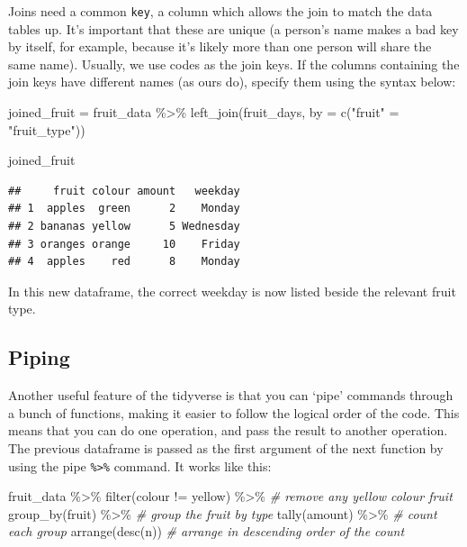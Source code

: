 \documentclass[
]{book}
\newenvironment{Shaded}{\begin{snugshade}}{\end{snugshade}}
\newcommand{\AttributeTok}[1]{\textcolor[rgb]{0.77,0.63,0.00}{#1}}
\newcommand{\CommentTok}[1]{\textcolor[rgb]{0.56,0.35,0.01}{\textit{#1}}}
\newcommand{\FunctionTok}[1]{\textcolor[rgb]{0.00,0.00,0.00}{#1}}
\newcommand{\NormalTok}[1]{#1}
\newcommand{\OtherTok}[1]{\textcolor[rgb]{0.56,0.35,0.01}{#1}}
\newcommand{\SpecialCharTok}[1]{\textcolor[rgb]{0.00,0.00,0.00}{#1}}
\newcommand{\StringTok}[1]{\textcolor[rgb]{0.31,0.60,0.02}{#1}}
\begin{document}
Joins need a common \texttt{key}, a column which allows the join to match the data tables up. It's important that these are unique (a person's name makes a bad key by itself, for example, because it's likely more than one person will share the same name). Usually, we use codes as the join keys. If the columns containing the join keys have different names (as ours do), specify them using the syntax below:

\begin{Shaded}
\begin{Highlighting}[]
\NormalTok{joined\_fruit }\OtherTok{=}\NormalTok{ fruit\_data }\SpecialCharTok{\%\textgreater{}\%} \FunctionTok{left\_join}\NormalTok{(fruit\_days, }\AttributeTok{by =} \FunctionTok{c}\NormalTok{(}\StringTok{"fruit"} \OtherTok{=} \StringTok{"fruit\_type"}\NormalTok{))}

\NormalTok{joined\_fruit}
\end{Highlighting}
\end{Shaded}

\begin{verbatim}
##     fruit colour amount   weekday
## 1  apples  green      2    Monday
## 2 bananas yellow      5 Wednesday
## 3 oranges orange     10    Friday
## 4  apples    red      8    Monday
\end{verbatim}

In this new dataframe, the correct weekday is now listed beside the relevant fruit type.

\hypertarget{piping}{%
\subsection{Piping}\label{piping}}

Another useful feature of the tidyverse is that you can `pipe' commands through a bunch of functions, making it easier to follow the logical order of the code. This means that you can do one operation, and pass the result to another operation. The previous dataframe is passed as the first argument of the next function by using the pipe \texttt{\%\textgreater{}\%} command. It works like this:

\begin{Shaded}
\begin{Highlighting}[]
\NormalTok{fruit\_data }\SpecialCharTok{\%\textgreater{}\%} 
  \FunctionTok{filter}\NormalTok{(colour }\SpecialCharTok{!=} \StringTok{\textquotesingle{}yellow\textquotesingle{}}\NormalTok{) }\SpecialCharTok{\%\textgreater{}\%} \CommentTok{\# remove any yellow colour fruit}
  \FunctionTok{group\_by}\NormalTok{(fruit) }\SpecialCharTok{\%\textgreater{}\%} \CommentTok{\# group the fruit by type}
  \FunctionTok{tally}\NormalTok{(amount) }\SpecialCharTok{\%\textgreater{}\%} \CommentTok{\# count each group}
  \FunctionTok{arrange}\NormalTok{(}\FunctionTok{desc}\NormalTok{(n)) }\CommentTok{\# arrange in descending order of the count}
\end{Highlighting}
\end{Shaded}
\end{document}
